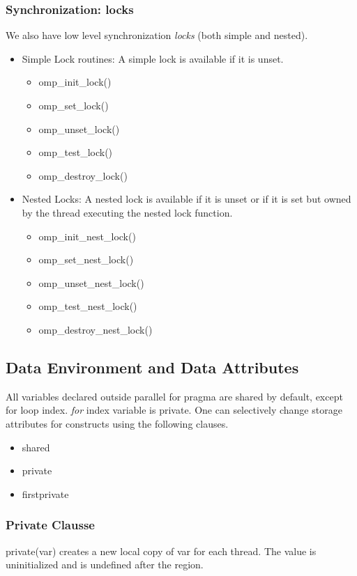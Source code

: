 \documentclass[twoside]{article}
\begin{document}
\subsubsection{Synchronization: locks}
We also have low level synchronization {\it locks} (both simple and nested).
\begin{itemize}
    \item Simple Lock routines: A simple lock is available if it is unset.
    \begin{itemize}
    \item omp\_init\_lock()
    \item omp\_set\_lock()
    \item omp\_unset\_lock()
    \item omp\_test\_lock()
    \item omp\_destroy\_lock()
    \end{itemize}
    \item Nested Locks: A nested lock is available if it is unset or if it is set but owned by the thread executing the nested lock function.
    \begin{itemize}
    \item omp\_init\_nest\_lock()
    \item omp\_set\_nest\_lock()
    \item omp\_unset\_nest\_lock()
    \item omp\_test\_nest\_lock()
    \item omp\_destroy\_nest\_lock()
    \end{itemize}
\end{itemize}

\subsection{Data Environment and Data Attributes}
All variables declared outside parallel for pragma are shared by default, except for loop index. {\it for} index variable is private. One can selectively change storage attributes for constructs using the following clauses.
\begin{itemize}
    \item shared
    \item private
    \item firstprivate
\end{itemize}

\subsubsection{Private Clausse}
private(var) creates a new local copy of var for each thread. The value is uninitialized and is undefined after the region.
\end{document}
